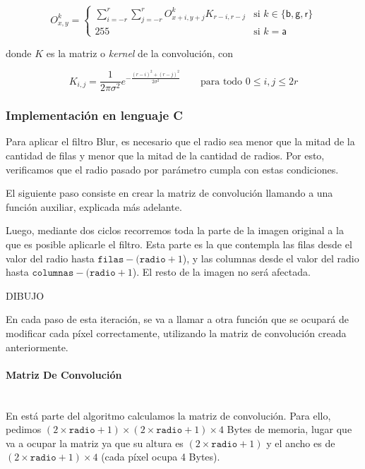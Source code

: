    \[ O_{x,y}^k = \begin{cases}
      \displaystyle \sum_{i=-r}^r \sum_{j=-r}^r O_{x+i,y+j}^k K_{r-i,r-j}
        & \text{si } k \in \lbrace \mathsf{b, g, r} \rbrace \\
      255
        & \text{si } k = \mathsf{a}
    \end{cases} \]

    donde $K$ es la matriz o \emph{kernel} de la convolución, con

    \[ K_{i,j} = \frac{1}{2 \pi \sigma^2} e^{- \frac{(r-i)^2 + (r-j)^2}{2 \sigma^2}} \qquad \text{para todo } 0 \leq i,j \leq 2r \]

    \subsubsection{Implementación en lenguaje C}

      Para aplicar el filtro Blur, es necesario que el radio sea menor que la mitad de la cantidad de filas y menor que la mitad de la cantidad de radios. Por esto, verificamos que el radio pasado por parámetro cumpla con estas condiciones.
      
      El siguiente paso consiste en crear la matriz de convolución llamando a una función auxiliar, explicada más adelante. 

      Luego, mediante dos ciclos recorremos toda la parte de  la imagen original a la que es posible aplicarle el filtro. Esta parte es la que contempla las filas desde el valor del radio hasta $\mathtt{filas} - (\mathtt{radio} + 1$), y las columnas desde el valor del radio hasta $\mathtt{columnas} - (\mathtt{radio} + 1$). El resto de la imagen no será afectada. 

      DIBUJO

      En cada paso de esta iteración, se va a llamar a otra función que se ocupará de modificar cada píxel correctamente, utilizando la matriz de convolución creada anteriormente. 

      \paragraph{Matriz De Convolución} \mbox{} \\
        En está parte del algoritmo calculamos la matriz de convolución. Para ello, pedimos $(2 \times \mathtt{radio} + 1) \times (2 \times \mathtt{radio} + 1) \times 4$ Bytes de memoria, lugar que va a ocupar la matriz ya que su altura es $(2 \times \mathtt{radio} + 1)$ y el ancho es de $(2 \times \mathtt{radio} + 1) \times 4$ (cada píxel ocupa 4 Bytes).
        

